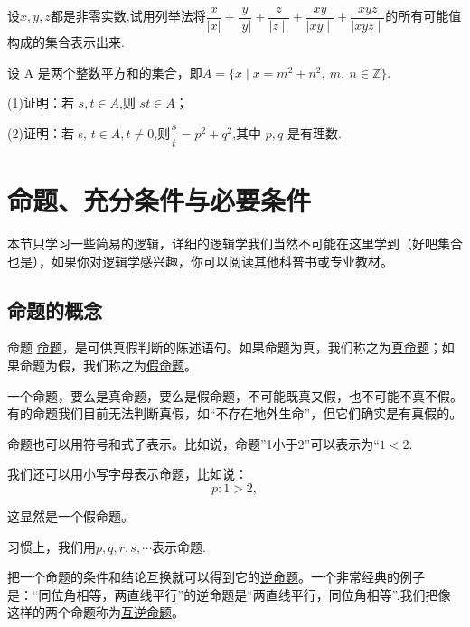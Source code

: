 \documentclass[lang=cn,math=cm,chinesefont=nofont,11pt,scheme=chinese,onecol]{elegantbook}
\begin{document}
\begin{exercise}\label{exer:17}
  设$x,y,z$都是非零实数,试用列举法将$\dfrac x{|x|}+\dfrac y{|y|}+{\dfrac{z}{\mid z\mid}}+{\dfrac{xy}{\mid xy\mid}}+{\dfrac{xyz}{\mid xyz\mid}}$的所有可能值构成的集合表示出来.
\end{exercise}

\begin{exercise}\label{exer:18}
  设 A 是两个整数平方和的集合，即$A=\{x\mid x=m^2+n^2,\:m,\:n\in\mathbb{Z}\}.$

(1)证明：若 $s,t{\in}A$,则 $st{\in}A$；

(2)证明：若 s, $t\in A,t\neq0$,则$\dfrac st=p^2+q^2$,其中 $p,q$ 是有理数.
\end{exercise}

\section{命题、充分条件与必要条件}
本节只学习一些简易的逻辑，详细的逻辑学我们当然不可能在这里学到（好吧集合也是），如果你对逻辑学感兴趣，你可以阅读其他科普书或专业教材。

\subsection{命题的概念}

\begin{definition}{命题}
  \underline{命题}，是可供真假判断的陈述语句。如果命题为真，我们称之为\underline{真命题}；如果命题为假，我们称之为\underline{假命题}。
\end{definition}

\begin{remark}
  一个命题，要么是真命题，要么是假命题，不可能既真又假，也不可能不真不假。有的命题我们目前无法判断真假，如“不存在地外生命”，但它们确实是有真假的。
\end{remark}

命题也可以用符号和式子表示。比如说，命题”1小于2”可以表示为“$1<2$.

我们还可以用小写字母表示命题，比如说：$$p:1>2,$$

这显然是一个假命题。

习惯上，我们用$p,q,r,s,\cdots$表示命题.

\hspace*{\fill}

把一个命题的条件和结论互换就可以得到它的\underline{逆命题}。一个非常经典的例子是：“同位角相等，两直线平行”的逆命题是“两直线平行，同位角相等”.我们把像这样的两个命题称为\underline{互逆命题}。
\end{document}
